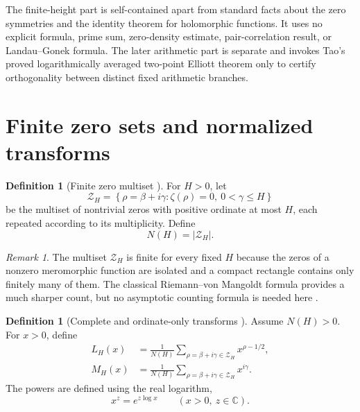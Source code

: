 \documentclass[11pt]{amsart}
\numberwithin{equation}{section}
\theoremstyle{plain}
\theoremstyle{definition}
\newtheorem{definition}[theorem]{Definition}
\theoremstyle{remark}
\newtheorem{remark}[theorem]{Remark}
\begin{document}
The finite-height part is self-contained apart from standard facts about the zero symmetries and the identity theorem for holomorphic functions.  It uses no explicit formula, prime sum, zero-density estimate, pair-correlation result, or Landau--Gonek formula.  The later arithmetic part is separate and invokes Tao's proved logarithmically averaged two-point Elliott theorem only to certify orthogonality between distinct fixed arithmetic branches.

\section{Finite zero sets and normalized transforms}
\label{sec:definitions}

\begin{definition}[Finite zero multiset {\normalfont[Standard]}]
\label{def:zero_multiset}
For $H>0$, let
\begin{equation}
\mathcal Z_H
=
\left\{
\rho=\beta+i\gamma:\zeta(\rho)=0,\ 0<\gamma\leq H
\right\}
\label{eq:zero_multiset}
\end{equation}
be the multiset of nontrivial zeros with positive ordinate at most $H$, each repeated according to its multiplicity.  Define
\begin{equation}
N(H)=|\mathcal Z_H|.
\label{eq:NH_definition}
\end{equation}
\end{definition}

\begin{remark}
\label{rem:finiteness}
The multiset $\mathcal Z_H$ is finite for every fixed $H$ because the zeros of a nonzero meromorphic function are isolated and a compact rectangle contains only finitely many of them.  The classical Riemann--von Mangoldt formula provides a much sharper count, but no asymptotic counting formula is needed here \cite{Titchmarsh1986}.
\end{remark}

\begin{definition}[Complete and ordinate-only transforms {}]
\label{def:transforms}
Assume $N(H)>0$.  For $x>0$, define
\begin{align}
L_H(x)
&=
\frac{1}{N(H)}
\sum_{\rho=\beta+i\gamma\in\mathcal Z_H}
 x^{\rho-1/2},
\label{eq:LH_definition}
\\
M_H(x)
&=
\frac{1}{N(H)}
\sum_{\rho=\beta+i\gamma\in\mathcal Z_H}
 x^{i\gamma}.
\label{eq:MH_definition}
\end{align}
The powers are defined using the real logarithm,
\begin{equation}
x^z=e^{z\log x}
\qquad(x>0,\ z\in\mathbb C).
\label{eq:real_log_power}
\end{equation}
\end{definition}
\end{document}

